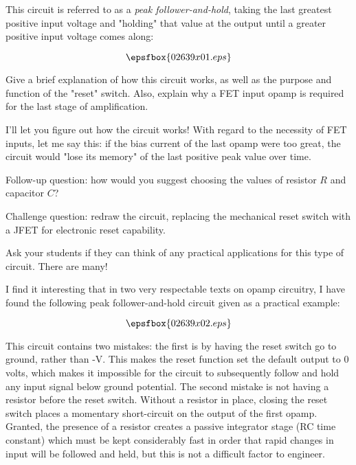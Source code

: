 

This circuit is referred to as a {\it peak follower-and-hold}, taking the last greatest positive input voltage and "holding" that value at the output until a greater positive input voltage comes along:

$$\epsfbox{02639x01.eps}$$

Give a brief explanation of how this circuit works, as well as the purpose and function of the "reset" switch.  Also, explain why a FET input opamp is required for the last stage of amplification.







I'll let you figure out how the circuit works!  With regard to the necessity of FET inputs, let me say this: if the bias current of the last opamp were too great, the circuit would "lose its memory" of the last positive peak value over time.

\vskip 10pt

Follow-up question: how would you suggest choosing the values of resistor $R$ and capacitor $C$?

\vskip 10pt

Challenge question: redraw the circuit, replacing the mechanical reset switch with a JFET for electronic reset capability.







Ask your students if they can think of any practical applications for this type of circuit.  There are many!

I find it interesting that in two very respectable texts on opamp circuitry, I have found the following peak follower-and-hold circuit given as a practical example:

$$\epsfbox{02639x02.eps}$$

This circuit contains two mistakes: the first is by having the reset switch go to ground, rather than -V.  This makes the reset function set the default output to 0 volts, which makes it impossible for the circuit to subsequently follow and hold any input signal below ground potential.  The second mistake is not having a resistor before the reset switch.  Without a resistor in place, closing the reset switch places a momentary short-circuit on the output of the first opamp.  Granted, the presence of a resistor creates a passive integrator stage (RC time constant) which must be kept considerably fast in order that rapid changes in input will be followed and held, but this is not a difficult factor to engineer.  




